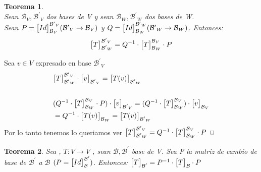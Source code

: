 \documentclass[]{article}
\newtheorem{theorem}{Teorema}
\newenvironment{proof}{\noindent{\bf Prueba:}}{$\hfill \Box$ \vspace{10pt}}
\newcommand{\base}{\text{$\mathcal{B}$}}
\newcommand{\basep}{\text{$\mathcal{B}^{\prime}$}}
\begin{document}
\begin{theorem}
    \\
    Sean $\base_V,\basep_V$ dos bases de V y sean  $\base_W,\basep_W$ dos bases de W.\\
    Sean $P=\cbs{Id}{\base_V}{\basep_V} (\basep_V\rightarrow\base_V)$
    y $Q=\cbs{Id}{\base_W}{\basep_W} (\basep_W\rightarrow\base_W)$. Entonces:
    \begin{align*}
        \cbs{T}{\basep_W}{\basep_V}= Q^{-1} \cdot \cbs{T}{\base_W}{\base_V} \cdot P
    \end{align*}
\end{theorem}
\begin{proof}
    Sea $v \in V$ expresado en base $\basep_V$
    \begin{align*}
        &\cbs{T}{\basep_W}{\basep_V} \cdot \cbs{v}{\basep_V}{} = \cbs{\T{v}}{\basep_W}{}\\\\
        &(Q^{-1} \cdot \cbs{T}{\base_W}{\base_V} \cdot P )\cdot \cbs{v}{\basep_V}{}
        = (Q^{-1} \cdot \cbs{T}{\base_W}{\base_V}) \cdot \cbs{v}{\base_V}{}\\
        &= Q^{-1} \cdot  \cbs{\T{v}}{\base_W}{} = \cbs{\T{v}}{\basep_W}{}
    \end{align*}
    Por lo tanto tenemos lo queriamos ver $\cbs{T}{\basep_W}{\basep_V}= Q^{-1} \cdot \cbs{T}{\base_W}{\base_V} \cdot P$
\end{proof}

\begin{theorem}
    Sea \espvec , $T:V \rightarrow V$ \tl , sean $\base,\basep$ base de V. Sea P la matriz de cambio de base de $\basep$ a $\base$
    $(P=\cbs{Id}{\base}{\basep})$. Entonces: \underline{$\cbs{T}{\basep}{}= P^{-1} \cdot \cbs{T}{\base}{} \cdot P$}
\end{theorem}
\end{document}
